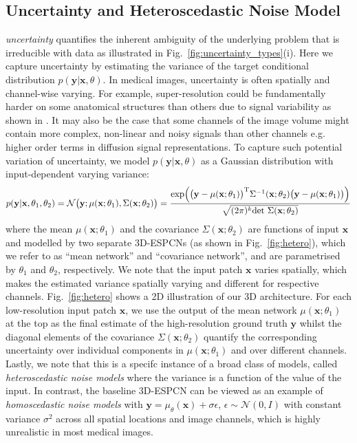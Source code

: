 \subsection{ Uncertainty and Heteroscedastic Noise Model \label{sec:hetero}} 
\textit{ uncertainty} quantifies the inherent ambiguity of the underlying problem that is irreducible with data as illustrated in Fig.~\ref{fig:uncertainty_types}(i). Here we capture  uncertainty by estimating the variance of the target conditional distribution $p(\mathbf{y}|\mathbf{x}, \theta)$. In medical images,  uncertainty is often spatially and channel-wise varying. For example, super-resolution could be fundamentally harder on some anatomical structures than others due to signal variability as shown in \cite{tanno2016bayesian}. It may also be the case that some channels of the image volume might contain more complex, non-linear and noisy signals than other channels e.g. higher order terms in diffusion signal representations. To capture such potential variation of  uncertainty, we model $p(\mathbf{y}|\mathbf{x}, \theta)$ as a Gaussian distribution with input-dependent varying variance: 
\begin{equation}\label{eq:hetero_pdf}
p(\mathbf{y}|\mathbf{x},\mathbf{\theta}_1, \mathbf{\theta}_2) = \mathcal{N}\big{(}\mathbf{y}; \mu(\mathbf{x};\mathbf{\theta}_1),\Sigma(\mathbf{x};\theta_2)\big{)} = \frac{\text{exp} \Big{(} \big{(}\mathbf{y}-\mu(\mathbf{x};\theta_1)\big{)}^\text{T}\Sigma^{-1}(\mathbf{x};\theta_2)\big{(}\mathbf{y}-\mu(\mathbf{x};\theta_1)\big{)}\Big{)}}{\sqrt{(2\pi)^{k} \text{det }\Sigma( \mathbf{x};\theta_2)} }
\end{equation}
 where the mean $\mu(\mathbf{x};\theta_1)$ and the covariance $\Sigma(\mathbf{x};\theta_2)$ are functions of input $\mathbf{x}$ and modelled by two separate 3D-ESPCNs (as shown in 
 Fig.~\ref{fig:hetero}), which we refer to as ``mean network'' and ``covariance network'', and are parametrised by $\theta_1$ and $\theta_2$, respectively. We note that the input patch $\mathbf{x}$ varies spatially, which makes the estimated variance spatially varying and different for respective channels. Fig.~\ref{fig:hetero} shows a 2D illustration of our 3D architecture. For each low-resolution input patch $\mathbf{x}$, we use the output of the mean network $\mu(\mathbf{x};\theta_1)$ at the top as the final estimate of the high-resolution ground truth $\mathbf{y}$ whilst the diagonal elements of the covariance $\Sigma(\mathbf{x};\theta_2)$ quantify the corresponding  uncertainty over individual components in $\mu(\mathbf{x};\theta_1)$ and over different channels. Lastly, we note that this is a specifc instance of a broad class of models, called \textit{heteroscedastic noise models} \cite{rao1970estimation,nix1994estimating} where the variance  is a function of the value of the input. In contrast, the baseline 3D-ESPCN can be viewed as an example of \textit{homoscedastic noise models} with $\mathbf{y} = \mu_{\theta}(\mathbf{x}) + \sigma \epsilon$, $\epsilon \sim \mathcal{N}(0, I)$ with constant variance $ \sigma^2$ across all spatial locations and image channels, which is highly unrealistic in most medical images. 
 

